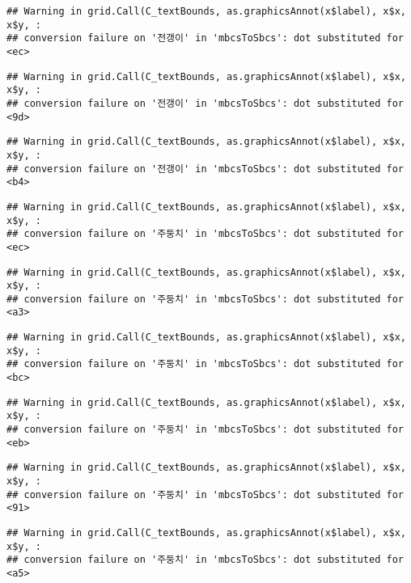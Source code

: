 \documentclass[
]{article}
\begin{document}
\begin{verbatim}
## Warning in grid.Call(C_textBounds, as.graphicsAnnot(x$label), x$x, x$y, :
## conversion failure on '전갱이' in 'mbcsToSbcs': dot substituted for <ec>
\end{verbatim}

\begin{verbatim}
## Warning in grid.Call(C_textBounds, as.graphicsAnnot(x$label), x$x, x$y, :
## conversion failure on '전갱이' in 'mbcsToSbcs': dot substituted for <9d>
\end{verbatim}

\begin{verbatim}
## Warning in grid.Call(C_textBounds, as.graphicsAnnot(x$label), x$x, x$y, :
## conversion failure on '전갱이' in 'mbcsToSbcs': dot substituted for <b4>
\end{verbatim}

\begin{verbatim}
## Warning in grid.Call(C_textBounds, as.graphicsAnnot(x$label), x$x, x$y, :
## conversion failure on '주둥치' in 'mbcsToSbcs': dot substituted for <ec>
\end{verbatim}

\begin{verbatim}
## Warning in grid.Call(C_textBounds, as.graphicsAnnot(x$label), x$x, x$y, :
## conversion failure on '주둥치' in 'mbcsToSbcs': dot substituted for <a3>
\end{verbatim}

\begin{verbatim}
## Warning in grid.Call(C_textBounds, as.graphicsAnnot(x$label), x$x, x$y, :
## conversion failure on '주둥치' in 'mbcsToSbcs': dot substituted for <bc>
\end{verbatim}

\begin{verbatim}
## Warning in grid.Call(C_textBounds, as.graphicsAnnot(x$label), x$x, x$y, :
## conversion failure on '주둥치' in 'mbcsToSbcs': dot substituted for <eb>
\end{verbatim}

\begin{verbatim}
## Warning in grid.Call(C_textBounds, as.graphicsAnnot(x$label), x$x, x$y, :
## conversion failure on '주둥치' in 'mbcsToSbcs': dot substituted for <91>
\end{verbatim}

\begin{verbatim}
## Warning in grid.Call(C_textBounds, as.graphicsAnnot(x$label), x$x, x$y, :
## conversion failure on '주둥치' in 'mbcsToSbcs': dot substituted for <a5>
\end{verbatim}
\end{document}
